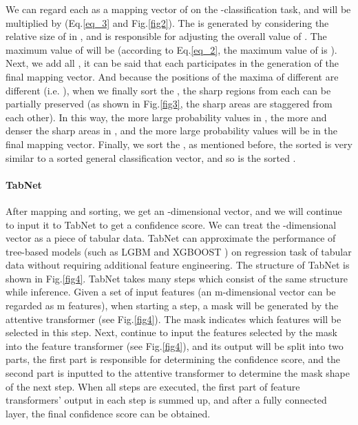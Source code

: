 \documentclass{article}
\begin{document}
We can regard each  as a mapping vector of  on the -classification task, and  will be multiplied by  (Eq.\ref{eq_3} and Fig.\ref{fig2}). The  is generated by considering the relative size of  in , and is responsible for adjusting the overall value of . The maximum value of  will be  (according to Eq.\ref{eq_2}, the maximum value of  is ). Next, we add all , it can be said that each  participates in the generation of the final mapping vector. And because the positions of the maxima of different  are different (i.e. ), when we finally sort the , the sharp regions from each  can be partially preserved (as shown in Fig.\ref{fig3}, the sharp areas are staggered from each other). In this way, the more large probability values in , the more and denser the sharp areas in , and the more large probability values will be in the final mapping vector. Finally, we sort the , as mentioned before, the sorted  is very similar to a sorted general classification vector, and so is the sorted .



\paragraph{TabNet}
After mapping and sorting, we get an -dimensional vector, and we will continue to input it to TabNet \cite{arik2021tabnet} to get a confidence score. We can treat the -dimensional vector as a piece of tabular data. TabNet can approximate the performance of tree-based models (such as LGBM \cite{ke2017lightgbm} and XGBOOST \cite{chen2015xgboost}) on regression task of tabular data without requiring additional feature engineering. The structure of TabNet is shown in Fig.\ref{fig4}. TabNet takes many steps which consist of the same structure while inference. Given a set of input features (an m-dimensional vector can be regarded as m features), when starting a step, a mask will be generated by the attentive transformer \cite{arik2021tabnet} (see Fig.\ref{fig4}). The mask indicates which features will be selected in this step. Next, continue to input the features selected by the mask into the feature transformer \cite{arik2021tabnet} (see Fig.\ref{fig4}), and its output will be split into two parts, the first part is responsible for determining the confidence score, and the second part is inputted to the attentive transformer to determine the mask shape of the next step. When all steps are executed, the first part of feature transformers’ output in each step is summed up, and after a fully connected layer, the final confidence score can be obtained.
\end{document}
